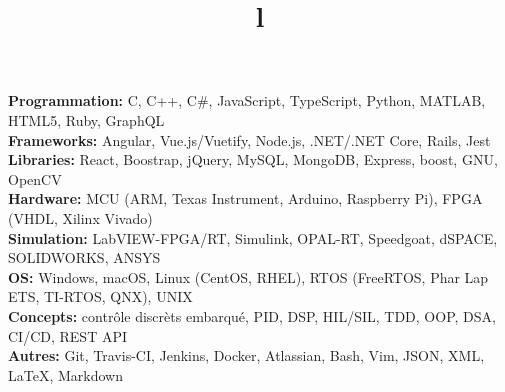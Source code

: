 \documentclass[mm]{res}
\begin{document}



\begin{resume}

\npspctoprule
\section{\headingskills}
\tb \textbf{Programmation:} C, C++, C\#, JavaScript, TypeScript, Python, MATLAB, HTML5, Ruby, GraphQL\\
\tb \textbf{Frameworks:} Angular, Vue.js/Vuetify, Node.js, .NET/.NET Core, Rails, Jest\\
\tb \textbf{Libraries:} React, Boostrap, jQuery, MySQL, MongoDB, Express, boost, GNU, OpenCV\\
\tb \textbf{Hardware:} MCU (ARM, Texas Instrument, Arduino, Raspberry Pi), FPGA (VHDL, Xilinx Vivado)\\
\tb \textbf{Simulation:} LabVIEW-FPGA/RT, Simulink, OPAL-RT, Speedgoat, dSPACE, SOLIDWORKS, ANSYS\\
\tb \textbf{OS:} Windows, macOS, Linux (CentOS, RHEL), RTOS (FreeRTOS, Phar Lap ETS, TI-RTOS, QNX), UNIX\\
\tb \textbf{Concepts:} contr\^ole discr\`ets embarqu\'e, PID, DSP, HIL/SIL, TDD, OOP, DSA, CI/CD, REST API\\
\tb \textbf{Autres:} Git, Travis-CI, Jenkins, Docker, Atlassian, Bash, Vim, JSON, XML, \LaTeX, Markdown

\toprule

\section{\headingeducation}
\begin{format}
\\
\title{l}\\
\end{format}


\end{resume}
\end{document}
